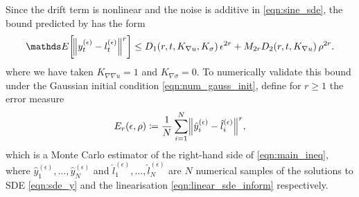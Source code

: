 Since the drift term is nonlinear and the noise is additive in \cref{eqn:sine_sde}, the bound predicted by  has the form
\[
	\avg{\norm{y_t^{(\epsilon)} - l_t^{(\epsilon)}}^r} \leq D_1\!\left(r,t, K_{\nabla u}, K_\sigma\right)\epsilon^{2r} + M_{2r}D_2\!\left(r,t, K_{\nabla u}\right)\rho^{2r}.
\]
where we have taken \(K_{\nabla\nabla u} = 1\) and \(K_{\nabla\sigma} = 0\).
To numerically validate this bound under the Gaussian initial condition \cref{eqn:num_gauss_init}, define for \(r \geq 1\) the error measure
\begin{equation}
	E_r\!\left(\epsilon, \rho\right) \coloneqq \frac{1}{N}\sum_{i=1}^N{\norm{\hat{y}_{i}^{(\epsilon)} - \hat{l}_i^{(\epsilon)}}^r},
	\label{eqn:strong_err_mc_estimate}
\end{equation}
which is a Monte Carlo estimator of the right-hand side of \cref{eqn:main_ineq}, where \(\hat{y}_1^{(\epsilon)},\dotsc, \hat{y}_N^{(\epsilon)}\) and \(\hat{l}_1^{(\epsilon)},\dotsc, \hat{l}_N^{(\epsilon)}\) are \(N\) numerical samples of the solutions to SDE \cref{eqn:sde_y} and the linearisation \cref{eqn:linear_sde_inform} respectively.

